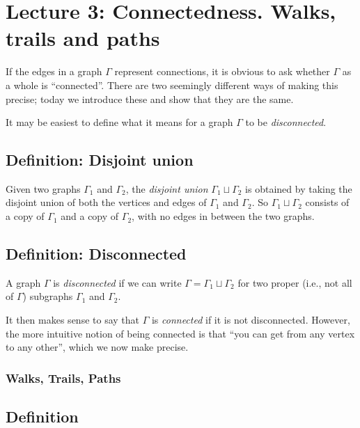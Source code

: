 \documentclass[]{article}
\begin{document}
\section{Lecture 3: Connectedness.  Walks, trails and paths}

If the edges in a graph \(\Gamma\) represent connections, it is obvious
to ask whether \(\Gamma\) as a whole is ``connected''. There are two
seemingly different ways of making this precise; today we introduce
these and show that they are the same.

It may be easiest to define what it means for a graph \(\Gamma\) to be
\emph{disconnected}.

\subsection{Definition: Disjoint union}\label{definition-disjoint-union}

Given two graphs \(\Gamma_1\) and \(\Gamma_2\), the \emph{disjoint
union} \(\Gamma_1\sqcup \Gamma_2\) is obtained by taking the disjoint
union of both the vertices and edges of \(\Gamma_1\) and \(\Gamma_2\).
So \(\Gamma_1\sqcup\Gamma_2\) consists of a copy of \(\Gamma_1\) and a
copy of \(\Gamma_2\), with no edges in between the two graphs.

\subsection{Definition: Disconnected}\label{definition-disconnected}

A graph \(\Gamma\) is \emph{disconnected} if we can write
\(\Gamma=\Gamma_1\sqcup \Gamma_2\) for two proper (i.e., not all of
\(\Gamma\)) subgraphs \(\Gamma_1\) and \(\Gamma_2\).

It then makes sense to say that \(\Gamma\) is \emph{connected} if it is
not disconnected. However, the more intuitive notion of being connected
is that ``you can get from any vertex to any other'', which we now make
precise.

\subsubsection{Walks, Trails, Paths}\label{walks-trails-paths}

\subsection{Definition}\label{definition-1}
\end{document}
